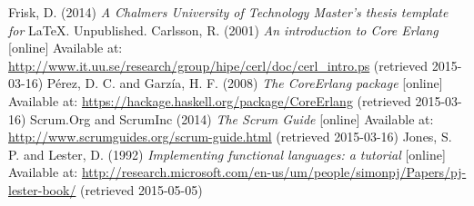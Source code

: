 \begin{thebibliography}{69}

 Frisk, D. (2014) \textit{A Chalmers University of Technology Master's thesis template for} \LaTeX . Unpublished.
 Carlsson, R. (2001) \textit{An introduction to Core Erlang} [online] Available at: \url{http://www.it.uu.se/research/group/hipe/cerl/doc/cerl_intro.ps} (retrieved 2015-03-16)
 Pérez, D. C. and Garzía, H. F. (2008) \textit{The CoreErlang package} [online] Available at: \url{https://hackage.haskell.org/package/CoreErlang} (retrieved 2015-03-16)
 Scrum.Org and ScrumInc (2014) \textit{The Scrum Guide} [online] Available at: \url{http://www.scrumguides.org/scrum-guide.html} (retrieved 2015-03-16)
 Jones, S. P. and Lester, D. (1992) \textit{Implementing functional languages: a tutorial} [online] Available at: \url{http://research.microsoft.com/en-us/um/people/simonpj/Papers/pj-lester-book/} (retrieved 2015-05-05)

\end{thebibliography}
